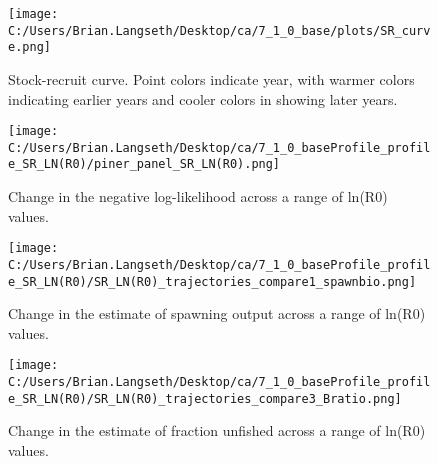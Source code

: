 \documentclass[11pt,
  english,
  a4paper,
]{article}
\begin{document}
\begin{figure}
\centering
\texttt{[image: C:/Users/Brian.Langseth/Desktop/ca/7\_1\_0\_base/plots/SR\_curve.png]}
\caption{Stock-recruit curve. Point colors indicate year, with warmer colors indicating earlier years and cooler colors in showing later years.\label{fig:bh-curve}}
\end{figure}

\tagmcend\tagstructend


\begin{figure}
\centering
\texttt{[image: C:/Users/Brian.Langseth/Desktop/ca/7\_1\_0\_baseProfile\_profile\_SR\_LN(R0)/piner\_panel\_SR\_LN(R0).png]}
\caption{Change in the negative log-likelihood across a range of ln(R0) values.\label{fig:r0-profile}}
\end{figure}

\tagmcend\tagstructend


\begin{figure}
\centering
\texttt{[image: C:/Users/Brian.Langseth/Desktop/ca/7\_1\_0\_baseProfile\_profile\_SR\_LN(R0)/SR\_LN(R0)\_trajectories\_compare1\_spawnbio.png]}
\caption{Change in the estimate of spawning output across a range of ln(R0) values.\label{fig:r0-ssb}}
\end{figure}

\tagmcend\tagstructend


\begin{figure}
\centering
\texttt{[image: C:/Users/Brian.Langseth/Desktop/ca/7\_1\_0\_baseProfile\_profile\_SR\_LN(R0)/SR\_LN(R0)\_trajectories\_compare3\_Bratio.png]}
\caption{Change in the estimate of fraction unfished across a range of ln(R0) values.\label{fig:r0-depl}}
\end{figure}

\tagmcend\tagstructend

\end{document}

